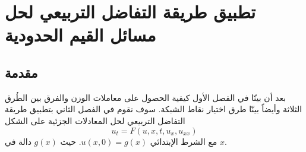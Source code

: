\chapter{تطبيق طريقة التفاضل التربيعي لحل مسائل القيم الحدودية}

\section[مقدمة]{مقدمة }
بعد أن بينّا في الفصل الأول كيفية الحصول على معاملات الوزن والفرق بين الطُرق الثلاثة وأيضاً بينّا طرق اختيار نقاط الشبكة. سوف نقوم في الفصل الثاني بتطبيق طريقة التفاضل التربيعي لحل المعادلات الجزئية على الشكل 
\begin{equation}\label{eq:one_dim_diff_eq}
	u_t=F(u,x,t,u_x,u_{xx})
\end{equation}
مع الشرط الإبتدائي $u(x,0)=g(x)$. حيث $g(x)$ دالة في $x$.

